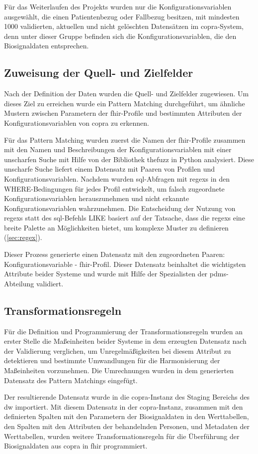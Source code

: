 Für das Weiterlaufen des Projekts wurden nur die Konfigurationsvariablen ausgewählt, die einen Patientenbezug oder Fallbezug besitzen, mit mindesten 1000 validierten, aktuellen und nicht gelöschten Datensätzen im \ac{copra}-System, denn unter dieser Gruppe befinden sich die Konfigurationsvariablen, die den Biosignaldaten entsprechen.

\subsection{Zuweisung der Quell- und Zielfelder} \label{sec:patternmatchingicucopra}

Nach der Definition der Daten wurden die Quell- und Zielfelder zugewiesen. Um dieses Ziel zu erreichen wurde ein Pattern Matching durchgeführt, um ähnliche Mustern zwischen Parametern der \ac{fhir}-Profile und bestimmten Attributen der Konfigurationsvariablen von \ac{copra} zu erkennen. 

Für das Pattern Matching wurden zuerst die Namen der \ac{fhir}-Profile zusammen mit den Namen und Beschreibungen der Konfigurationsvariablen mit einer unscharfen Suche mit Hilfe von der Bibliothek \glqq thefuzz\grqq{} in Python analysiert. Diese unscharfe Suche liefert einem Datensatz mit Paaren von Profilen und Konfigurationsvariablen. Nachdem wurden \ac{sql}-Abfragen mit \acp{regex} in den WHERE-Bedingungen für jedes Profil entwickelt, um falsch zugeordnete Konfigurationsvariablen herauszunehmen und nicht erkannte Konfigurationsvariablen wahrzunehmen. Die Entscheidung der Nutzung von \acp{regex} statt des \ac{sql}-Befehls \glqq LIKE\grqq{} basiert auf der Tatsache, dass die \acp{regex} eine breite Palette an Möglichkeiten bietet, um komplexe Muster zu definieren (\ref{sec:regex}).

Dieser Prozess generierte einen Datensatz mit den zugeordneten Paaren: Konfigurationsvariable - \ac{fhir}-Profil. Dieser Datensatz beinhaltet die wichtigsten Attribute beider Systeme und wurde mit Hilfe der Spezialisten der \ac{pdms}-Abteilung validiert.

\subsection{Transformationsregeln} \label{sec:transformrules}

Für die Definition und Programmierung der Transformationsregeln wurden an erster Stelle die Maßeinheiten beider Systeme in dem erzeugten Datensatz nach der Validierung verglichen, um Unregelmäßigkeiten bei diesem Attribut zu detektieren und bestimmte Umwandlungen für die Harmonisierung der Maßeinheiten vorzunehmen. Die Umrechnungen wurden in dem generierten Datensatz des Pattern Matchings eingefügt.

Der resultierende Datensatz wurde in die \ac{copra}-Instanz des Staging Bereichs des \ac{dw} importiert. Mit diesem Datensatz in der \ac{copra}-Instanz, zusammen mit den definierten Spalten mit den Parametern der Biosignaldaten in den Werttabellen, den Spalten mit den Attributen der behandelnden Personen, und Metadaten der Werttabellen, wurden weitere Transformationsregeln für die Überführung der Biosignaldaten aus \ac{copra} in \ac{fhir} programmiert.